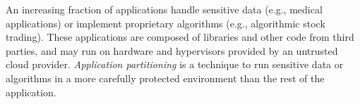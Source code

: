 \label{sec:intro}



An increasing fraction of applications handle sensitive data (e.g., medical applications)
or implement proprietary algorithms (e.g., algorithmic stock trading).
These applications are composed of 
libraries and other code from third parties, and may run on 
hardware and hypervisors provided by an untrusted cloud provider.
{\em Application partitioning} is a technique to
run sensitive data or algorithms in a more carefully protected environment
than the rest of the application.



